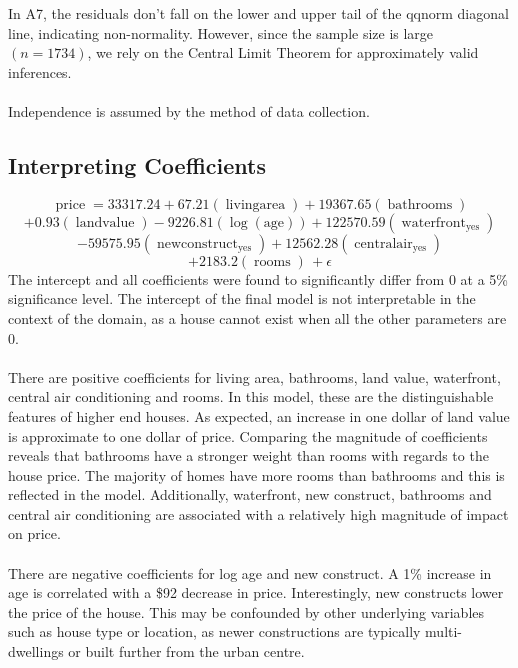 \documentclass[letterpaper,9pt,twocolumn,twoside,]{pinp}
\begin{document}
\noindent In A7, the residuals don't fall on the lower and upper tail of
the qqnorm diagonal line, indicating non-normality. However, since the
sample size is large \((n = 1734)\), we rely on the Central Limit
Theorem for approximately valid inferences.\\
~\\
\noindent Independence is assumed by the method of data collection.

\hypertarget{interpreting-coefficients}{%
\subsection{Interpreting Coefficients}\label{interpreting-coefficients}}

\hfill\break
\small
\[\operatorname{price} = 33317.24 + 67.21(\operatorname{living area}) + 19367.65(\operatorname{bathrooms})\]
\[+0.93(\operatorname{land value}) - 9226.81(\operatorname{\log(age)}) + 122570.59(\operatorname{waterfront}_{\operatorname{yes}})\]
\[-59575.95(\operatorname{new construct}_{\operatorname{yes}}) + 12562.28(\operatorname{central air}_{\operatorname{yes}})\]
\[+ 2183.2(\operatorname{rooms})\, + \epsilon\] \normalsize
\noindent The intercept and all coefficients were found to significantly
differ from 0 at a 5\% significance level. The intercept of the final
model is not interpretable in the context of the domain, as a house
cannot exist when all the other parameters are 0.\\
~\\
\noindent There are positive coefficients for living area, bathrooms,
land value, waterfront, central air conditioning and rooms. In this
model, these are the distinguishable features of higher end houses. As
expected, an increase in one dollar of land value is approximate to one
dollar of price. Comparing the magnitude of coefficients reveals that
bathrooms have a stronger weight than rooms with regards to the house
price. The majority of homes have more rooms than bathrooms and this is
reflected in the model. Additionally, waterfront, new construct,
bathrooms and central air conditioning are associated with a relatively
high magnitude of impact on price.\\
~\\
\noindent There are negative coefficients for log age and new construct.
A 1\% increase in age is correlated with a \$92 decrease in price.
Interestingly, new constructs lower the price of the house. This may be
confounded by other underlying variables such as house type or location,
as newer constructions are typically multi-dwellings or built further
from the urban centre.
\end{document}
